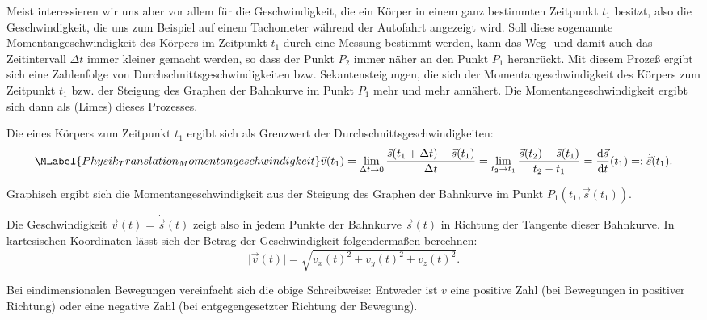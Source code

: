\begin{MContent}
  
  Meist interessieren wir uns aber vor allem f\"ur die Geschwindigkeit, die ein K\"orper in einem ganz bestimmten Zeitpunkt $t_1$ besitzt, also die Geschwindigkeit, die uns zum Beispiel auf einem Tachometer w\"ahrend der Autofahrt angezeigt wird. Soll diese sogenannte Momentangeschwindigkeit des K\"orpers im Zeitpunkt $t_1$ durch eine Messung bestimmt werden, kann das Weg- und damit auch das Zeitintervall $\Delta t$ immer kleiner gemacht werden, so dass der Punkt $P_2$ immer n\"aher an den Punkt $P_1$ heranr\"uckt. Mit diesem Proze{\ss} ergibt sich eine Zahlenfolge von Durchschnittsgeschwindigkeiten bzw. Sekantensteigungen, die sich der Momentangeschwindigkeit des K\"orpers zum Zeitpunkt $t_1$ bzw. der Steigung des Graphen der Bahnkurve im Punkt $P_1$ mehr und mehr ann\"ahert. Die Momentangeschwindigkeit ergibt sich dann als  (Limes) dieses Prozesses.
  
  
  \begin{MInfo}
  Die  eines K\"orpers zum Zeitpunkt $t_1$ ergibt sich als Grenzwert der Durchschnittsgeschwindigkeiten: 
     \begin{equation}\MLabel{Physik_Translation_Momentangeschwindigkeit}
    \vec{v}(t_1)=\lim_{\Delta t\rightarrow 0} \frac{\vec{s}(t_1+\Delta t)-\vec{s}(t_1)}{\Delta t}=\lim_{t_2\rightarrow t_1}\frac{\vec{s}(t_2)-\vec{s}(t_1)}{t_2-t_1}=\frac{\textrm{d}\vec{s}}{\textrm{d}t}(t_1)=:\dot{\vec{s}}(t_1).
    \end{equation}
   \end{MInfo}
    Graphisch ergibt sich die Momentangeschwindigkeit aus der Steigung des Graphen der Bahnkurve im Punkt $P_1(t_1,\vec{s}(t_1))$.
    
   
   Die Geschwindigkeit $\vec{v}(t)=\dot{\vec{s}}(t)$ zeigt also in jedem Punkte der Bahnkurve $\vec{s}(t)$ in Richtung der Tangente dieser Bahnkurve. In kartesischen Koordinaten l\"asst sich der Betrag der Geschwindigkeit folgenderma{\ss}en berechnen:
   $$
   \vert{\vec{v}(t)}\vert=\sqrt{v_x(t)^2+v_y(t)^2+v_z(t)^2}.
   $$
   
   Bei eindimensionalen Bewegungen vereinfacht sich die obige Schreibweise: Entweder ist $v$ eine positive Zahl (bei Bewegungen in positiver Richtung) oder eine negative Zahl (bei entgegengesetzter Richtung der Bewegung).
   
\end{MContent}

